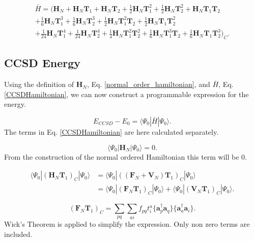 \begin{equation}
\begin{split}
\bar{H} = 
\big( \textbf{H}_N + \textbf{H}_N \textbf{T}_1 + \textbf{H}_N \textbf{T}_2
+ \frac{1}{2} \textbf{H}_N \textbf{T}_1^2
+ \frac{1}{2} \textbf{H}_N \textbf{T}_2^2
+ \textbf{H}_N \textbf{T}_1 \textbf{T}_2 \\
+ \frac{1}{6} \textbf{H}_N \textbf{T}_1^3
+ \frac{1}{6} \textbf{H}_N \textbf{T}_2^3
+ \frac{1}{2} \textbf{H}_N \textbf{T}_1^2 \textbf{T}_2
+ \frac{1}{2} \textbf{H}_N \textbf{T}_1 \textbf{T}_2^2 \\ 
+ \frac{1}{24} \textbf{H}_N \textbf{T}_1^4
+ \frac{1}{24} \textbf{H}_N \textbf{T}_2^4
+ \frac{1}{4} \textbf{H}_N \textbf{T}_1^2 \textbf{T}_2^2
+ \frac{1}{6} \textbf{H}_N \textbf{T}_1^3 \textbf{T}_2
+ \frac{1}{6} \textbf{H}_N \textbf{T}_1 \textbf{T}_2^3 \big)_C  .
\end{split} \label{CCSDHamiltonian}
\end{equation}

\subsection{CCSD Energy}
Using the definition of $\textbf{H}_N$, Eq. \eqref{normal_order_hamiltonian}, and $\bar{H}$, Eq. \eqref{CCSDHamiltonian}, we can now construct a programmable expression for the energy. 

\begin{equation}
E_{CCSD} - E_0 = \langle \Psi_0 | \bar{H} | \Psi_0 \rangle .
\end{equation}
The terms in Eq. \eqref{CCSDHamiltonian} are here calculated separately. 

\begin{equation}
\langle \Psi_0 | \textbf{H}_N | \Psi_0 \rangle = 0 .
\end{equation}
From the construction of the normal ordered Hamiltonian this term will be 0.

\begin{align}
\langle \Psi_0 | (\textbf{H}_N \textbf{T}_1)_C | \Psi_0 \rangle & = \langle \Psi_0 | \left((\textbf{F}_N + \textbf{V}_N ) \textbf{T}_1 \right)_C | \Psi_0 \rangle \nonumber \\ &
= \langle \Psi_0 | (\textbf{F}_N \textbf{T}_1)_C | \Psi_0 \rangle + \langle \Psi_0 | (\textbf{V}_N \textbf{T}_1)_C | \Psi_0 \rangle . \label{ene_1}
\end{align}

\begin{equation}
(\textbf{F}_N \textbf{T}_1)_C  = \sum_{pq} \sum_{ai} f_{pq} t_i^a  \{ \textbf{a}^{\dag}_p \textbf{a}_q\}  \{\textbf{a}^{\dag}_a \textbf{a}_i \} . 
\end{equation}
Wick's Theorem is applied to simplify the expression. Only non zero terms are included.

